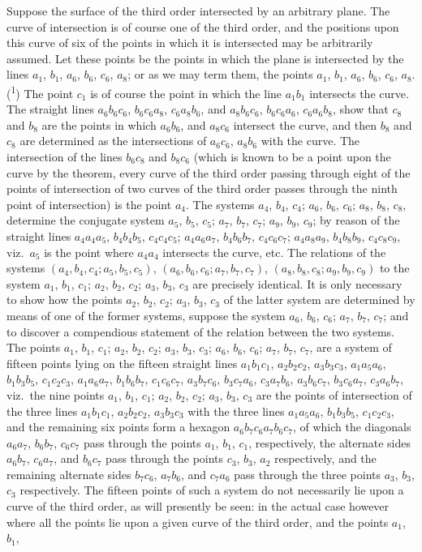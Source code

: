 \documentclass[12pt,a4paper]{article}
\begin{document}
Suppose the surface of the third order intersected by an arbitrary plane. The curve of intersection is of course one of the third order, and the positions upon this curve of six of the points in which it is intersected may be arbitrarily assumed. Let these points be the points in which the plane is intersected by the lines $a_1$, $b_1$, $a_6$, $b_6$, $c_6$, $a_8$; or as we may term them, the points $a_1$, $b_1$, $a_6$, $b_6$, $c_6$, $a_8$.(\textsuperscript{1}) The point $c_1$ is of course the point in which the line $a_1b_1$ intersects the curve. The straight lines $a_6b_6c_6$, $b_6c_6a_8$, $c_6a_8b_6$, and $a_8b_6c_6$, $b_6c_6a_6$, $c_6a_6b_8$, show that $c_8$ and $b_8$ are the points in which $a_6b_6$, and $a_8c_6$ intersect the curve, and then $b_8$ and $c_8$ are determined as the intersections of $a_6c_6$, $a_8b_6$ with the curve. The intersection of the lines $b_6c_8$ and $b_8c_6$ (which is known to be a point upon the curve by the theorem, every curve of the third order passing through eight of the points of intersection of two curves of the third order passes through the ninth point of intersection) is the point $a_4$. The systems $a_4$, $b_4$, $c_4$; $a_6$, $b_6$, $c_6$; $a_8$, $b_8$, $c_8$, determine the conjugate system $a_5$, $b_5$, $c_5$; $a_7$, $b_7$, $c_7$; $a_9$, $b_9$, $c_9$; by reason of the straight lines $a_4a_4a_5$, $b_4b_4b_5$, $c_4c_4c_5$; $a_4a_6a_7$, $b_4b_6b_7$, $c_4c_6c_7$; $a_4a_8a_9$, $b_4b_8b_9$, $c_4c_8c_9$, viz.\ $a_5$ is the point where $a_4a_4$ intersects the curve, etc. The relations of the systems $(a_4, b_4, c_4; a_5, b_5, c_5)$, $(a_6, b_6, c_6; a_7, b_7, c_7)$, $(a_8, b_8, c_8; a_9, b_9, c_9)$ to the system $a_1$, $b_1$, $c_1$; $a_2$, $b_2$, $c_2$; $a_3$, $b_3$, $c_3$ are precisely identical. It is only necessary to show how the points $a_2$, $b_2$, $c_2$; $a_3$, $b_3$, $c_3$ of the latter system are determined by means of one of the former systems, suppose the system $a_6$, $b_6$, $c_6$; $a_7$, $b_7$, $c_7$; and to discover a compendious statement of the relation between the two systems. The points $a_1$, $b_1$, $c_1$; $a_2$, $b_2$, $c_2$; $a_3$, $b_3$, $c_3$; $a_6$, $b_6$, $c_6$; $a_7$, $b_7$, $c_7$, are a system of fifteen points lying on the fifteen straight lines $a_1b_1c_1$, $a_2b_2c_2$, $a_3b_3c_3$, $a_1a_5a_6$, $b_1b_3b_5$, $c_1c_2c_3$, $a_1a_6a_7$, $b_1b_6b_7$, $c_1c_6c_7$, $a_3b_7c_6$, $b_3c_7a_6$, $c_3a_7b_6$, $a_3b_6c_7$, $b_3c_6a_7$, $c_3a_6b_7$, viz.\ the nine points $a_1$, $b_1$, $c_1$; $a_2$, $b_2$, $c_2$; $a_3$, $b_3$, $c_3$ are the points of intersection of the three lines $a_1b_1c_1$, $a_2b_2c_2$, $a_3b_3c_3$ with the three lines $a_1a_5a_6$, $b_1b_3b_5$, $c_1c_2c_3$, and the remaining six points form a hexagon $a_6b_7c_6a_7b_6c_7$, of which the diagonals $a_6a_7$, $b_6b_7$, $c_6c_7$ pass through the points $a_1$, $b_1$, $c_1$, respectively, the alternate sides $a_6b_7$, $c_6a_7$, and $b_6c_7$ pass through the points $c_3$, $b_3$, $a_2$ respectively, and the remaining alternate sides $b_7c_6$, $a_7b_6$, and $c_7a_6$ pass through the three points $a_3$, $b_3$, $c_3$ respectively. The fifteen points of such a system do not necessarily lie upon a curve of the third order, as will presently be seen: in the actual case however where all the points lie upon a given curve of the third order, and the points $a_1$, $b_1$, 
\end{document}
